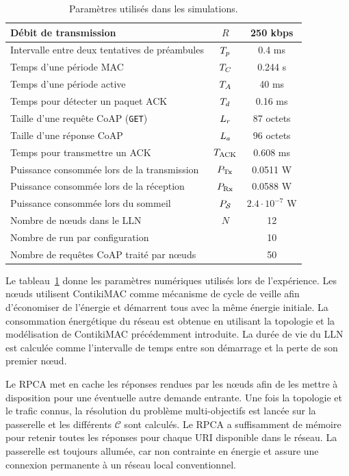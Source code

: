 \begin{table}[ht]
\centering
\begin{tabular}{|l|c|c|}
\hline
Débit de transmission & $R$ & 250 kbps \\
\hline
Intervalle entre deux tentatives de préambules & $T_p$ & 0.4 ms \\
\hline
Temps d'une période MAC & $T_C$ & 0.244 s\\
\hline
Temps d'une période active & $T_A$ & 40 ms\\
\hline
Temps pour détecter un paquet \ac{ACK} & $T_d$ & 0.16 ms \\
\hline
Taille d'une requête CoAP (\texttt{GET}) & $L_r$ & 87 octets\\
\hline
Taille d'une réponse CoAP & $L_a$ & 96 octets \\
\hline
Temps pour transmettre un \ieee{} \ac{ACK} & $T_{\textrm{ACK}}$ & 0.608 ms  \\
\hline
Puissance consommée lors de la transmission & $P_{\textrm{Tx}} $ & 0.0511 W  \\
\hline
Puissance consommée lors de la réception & $P_{\textrm{Rx}} $ & 0.0588 W  \\
\hline
Puissance consommée lors du sommeil & $P_{\mathcal{S}}$ & $2.4\cdot 10^{-7}$ W \\
\hline
Nombre de nœuds dans le \ac{LLN}  & $N$ & 12 \\
\hline
Nombre de run par configuration &  & 10  \\
\hline
Nombre de requêtes \ac{CoAP} traité par nœuds &  & 50 \\
\hline
\end{tabular}
\caption{Paramètres utilisés dans les simulations.}

\label{cache:table:sim_parameters}
\end{table}

Le tableau~\ref{cache:table:sim_parameters} donne les paramètres numériques utilisés lors de l'expérience.
Les nœuds utilisent ContikiMAC comme mécanisme de cycle de veille afin d'économiser de l'énergie et démarrent tous avec la même énergie initiale.
La consommation énergétique du réseau est obtenue en utilisant la topologie et la modélisation de ContikiMAC précédemment introduite.
La durée de vie du \ac{LLN} est calculée comme l'intervalle de temps entre son démarrage et la perte de son premier nœud.

Le \ac{RPCA} met en cache les réponses rendues par les nœuds afin de les mettre à disposition pour une éventuelle autre demande entrante.
Une fois la topologie et le trafic connus, la résolution du problème multi-objectifs est lancée sur la passerelle et les différents $\mathcal{C}$ sont calculés.
Le \ac{RPCA} a suffisamment de mémoire pour retenir toutes les réponses pour chaque \ac{URI} disponible dans le réseau.
La passerelle est toujours allumée, car non contrainte en énergie et assure une connexion permanente à un réseau local conventionnel.

